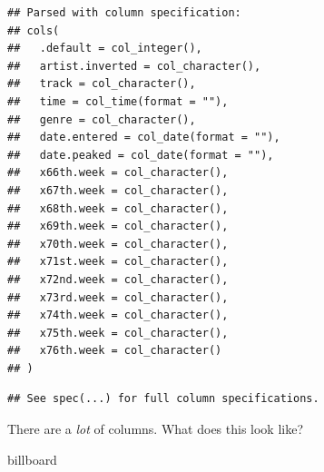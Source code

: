 \documentclass[]{tufte-book}
\newenvironment{Shaded}{}{}
\newcommand{\NormalTok}[1]{#1}
\theoremstyle{definition}
\theoremstyle{definition}
\theoremstyle{definition}
\theoremstyle{remark}
\begin{document}
\begin{verbatim}
## Parsed with column specification:
## cols(
##   .default = col_integer(),
##   artist.inverted = col_character(),
##   track = col_character(),
##   time = col_time(format = ""),
##   genre = col_character(),
##   date.entered = col_date(format = ""),
##   date.peaked = col_date(format = ""),
##   x66th.week = col_character(),
##   x67th.week = col_character(),
##   x68th.week = col_character(),
##   x69th.week = col_character(),
##   x70th.week = col_character(),
##   x71st.week = col_character(),
##   x72nd.week = col_character(),
##   x73rd.week = col_character(),
##   x74th.week = col_character(),
##   x75th.week = col_character(),
##   x76th.week = col_character()
## )
\end{verbatim}

\begin{verbatim}
## See spec(...) for full column specifications.
\end{verbatim}

There are a \emph{lot} of columns. What does this look like?

\begin{Shaded}
\begin{Highlighting}[]
\NormalTok{billboard}
\end{Highlighting}
\end{Shaded}
\end{document}
